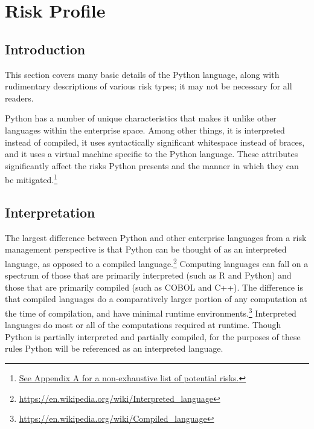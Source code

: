 \section{Risk Profile}
 
\thispagestyle{section_start_style}
 
    \subsection*{Introduction}

        \begin{tcolorbox}
            This section covers many basic details of the Python language, along with rudimentary descriptions of various risk types; it may not be necessary for all readers.
        \end{tcolorbox}

        Python has a number of unique characteristics that makes it unlike other languages within the enterprise space. Among other things, it is interpreted instead of compiled, it uses syntactically significant whitespace instead of braces, and it uses a virtual machine specific to the Python language. These attributes significantly affect the risks Python presents and the manner in which they can be mitigated.\footnote{\hyperref[sec:appendix_b]{See Appendix A for a non-exhaustive list of potential risks.}}

    \subsection{Interpretation}

        The largest difference between Python and other enterprise languages from a risk management perspective is that Python can be thought of as an interpreted language, as opposed to a compiled language.\footnote{\url{https://en.wikipedia.org/wiki/Interpreted_language}} Computing languages can fall on a spectrum of those that are primarily interpreted (such as R and Python) and those that are primarily compiled (such as COBOL and C++). The difference is that compiled languages do a comparatively larger portion of any computation at the time of compilation, and have minimal runtime environments.\footnote{\url{https://en.wikipedia.org/wiki/Compiled_language}} Interpreted languages do most or all of the computations required at runtime. Though Python is partially interpreted and partially compiled, for the purposes of these rules Python will be referenced as an interpreted language.


